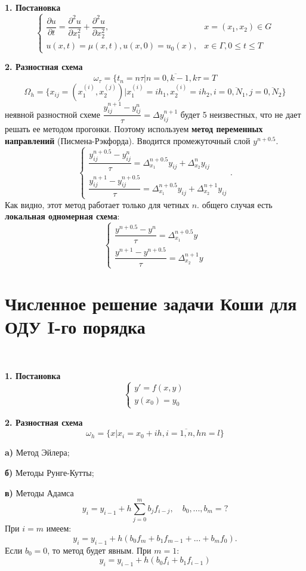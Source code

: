 \documentclass[9pt]{article}
\begin{document}
\ 
\par\textbf{1. Постановка}
\[\left\{
\begin{array}{ll}
    \dfrac{\partial u}{\partial t}=\dfrac{\partial^2u}{\partial x_1^2}+\dfrac{\partial^2u}{\partial x_2^2}, & x=(x_1,x_2)\in G \\
    u(x,t)=\mu(x,t),u(x,0)=u_0(x), & x\in\Gamma, 0\le t\le T
\end{array}
\right.\]
\par\textbf{2. Разностная схема}
\[\omega_\tau=\{t_n=n\tau|n=\overline{0,k-1},k\tau=T\]
\[\Omega_h=\{x_{ij}=(x_1^{(i)},x_2^{(j)})|x_1^{(i)}=ih_1,x_2^{(i)}=ih_2,i=\overline{0,N_1},j=\overline{0,N_2}\}\]
\parВ неявной разностной схеме \(\dfrac{y_{ij}^{n+1}-y_{ij}^n}{\tau}=\Delta y_{ij}^{n+1}\) будет 5 неизвестных, что не дает решать ее методом прогонки. Поэтому используем \textbf{метод переменных направлений} (Писмена-Рэкфорда). Вводится промежуточный слой \(y^{n+0.5}\).
\[\left\{
\begin{array}{l}
    \dfrac{y_{ij}^{n+0.5}-y_{ij}^n}{\tau}=\Delta^{n+0.5}_{x_1}y_{ij}+\Delta^{n}_{x_2}y_{ij}  \\
    \dfrac{y_{ij}^{n+1}-y_{ij}^{n+0.5}}{\tau}=\Delta^{n+0.5}_{x_1}y_{ij}+\Delta^{n+1}_{x_2}y_{ij}
\end{array}
\right..\]
Как видно, этот метод работает только для четных \(n\).
 общего случая есть \textbf{локальная одномерная схема}:
\[\left\{
\begin{array}{l}
    \dfrac{y^{n+0.5}-y^n}{\tau}=\Delta_{x_1}^{n+0.5}y \\
    \dfrac{y^{n+1}-y^{n+0.5}}{\tau}=\Delta_{x_2}^{n+1}y
\end{array}
\right.\]

\section{Численное решение задачи Коши для ОДУ I-го порядка}

\ 
\par\textbf{1. Постановка}
\[\left\{
\begin{array}{l}
    y'=f(x,y) \\
    y(x_0)=y_0
\end{array}
\right.\]
\par\textbf{2. Разностная схема}
\[\omega_h=\{x|x_i=x_0+ih,i=\overline{1,n},hn=l\}\]
\par\textbf{a)} Метод Эйлера;
\par\textbf{б)} Методы Рунге-Кутты;
\par\textbf{в)} Методы Адамса
\[y_i=y_{i-1}+h\sum_{j=0}^mb_jf_{i-j},\quad b_0,...,b_m=?\]
При \(i=m\) имеем:
\[y_i=y_{i-1}+h(b_0f_m+b_1f_{m-1}+...+b_mf_0).\]
Если \(b_0=0\), то метод будет явным.
При \(m=1\):
\[y_i=y_{i-1}+h(b_0f_i+b_1f_{i-1})\]
\end{document}
